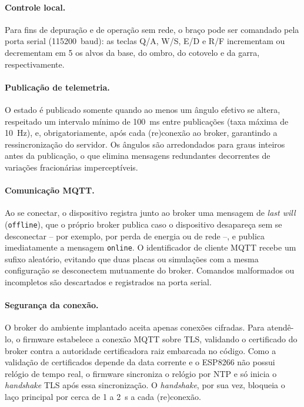 \documentclass[12pt]{article}
\begin{document}
\paragraph{Controle local.} Para fins de depuração e de operação sem rede, o braço pode ser comandado pela porta serial (115200~baud): as teclas Q/A, W/S, E/D e R/F incrementam ou decrementam em 5\textdegree{} os alvos da base, do ombro, do cotovelo e da garra, respectivamente.

\paragraph{Publicação de telemetria.} O estado é publicado somente quando ao menos um ângulo efetivo se altera, respeitado um intervalo mínimo de 100~ms entre publicações (taxa máxima de 10~Hz), e, obrigatoriamente, após cada (re)conexão ao broker, garantindo a ressincronização do servidor. Os ângulos são arredondados para graus inteiros antes da publicação, o que elimina mensagens redundantes decorrentes de variações fracionárias imperceptíveis.

\paragraph{Comunicação MQTT.} Ao se conectar, o dispositivo registra junto ao broker uma mensagem de \textit{last will} (\texttt{offline}), que o próprio broker publica caso o dispositivo desapareça sem se desconectar -- por exemplo, por perda de energia ou de rede --, e publica imediatamente a mensagem \texttt{online}. O identificador de cliente MQTT recebe um sufixo aleatório, evitando que duas placas ou simulações com a mesma configuração se desconectem mutuamente do broker. Comandos malformados ou incompletos são descartados e registrados na porta serial.

\paragraph{Segurança da conexão.} O broker do ambiente implantado aceita apenas conexões cifradas. Para atendê-lo, o firmware estabelece a conexão MQTT sobre TLS, validando o certificado do broker contra a autoridade certificadora raiz embarcada no código. Como a validação de certificados depende da data corrente e o ESP8266 não possui relógio de tempo real, o firmware sincroniza o relógio por NTP e só inicia o \textit{handshake} TLS após essa sincronização. O \textit{handshake}, por sua vez, bloqueia o laço principal por cerca de 1 a 2~s a cada (re)conexão.
\end{document}
